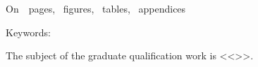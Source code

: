 \abstractRu %



\printTheAbstract %


On~~pages, 
~figures, 
~tables,
~appendices%

{Keywords: \keywordsEn} %
	
The subject of the graduate qualification work is <<\thesisTitleEn>>.
	
	
\abstractEn %

\abstractEn %
	


\thispagestyle{empty}
%
